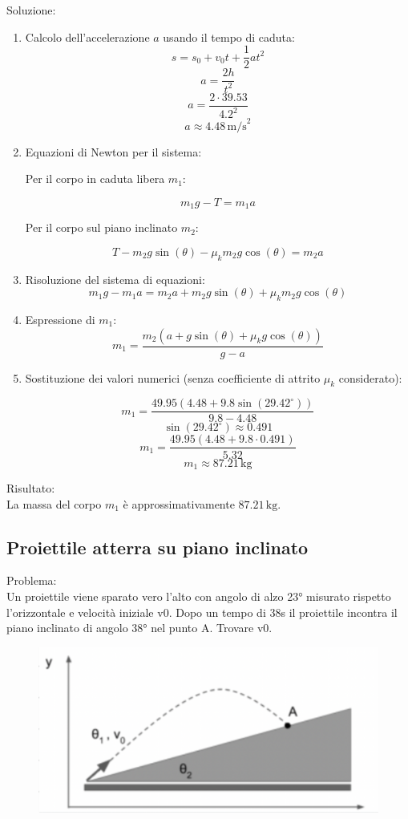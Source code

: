 \documentclass{article}
\begin{document}
Soluzione:
\begin{enumerate}
    \item Calcolo dell'accelerazione \( a \) usando il tempo di caduta:
    \[ s = s_0 + v_0t + \frac{1}{2}at^2 \]
    \[ a = \frac{2h}{t^2} \]
    \[ a = \frac{2 \cdot 39.53}{4.2^2} \]
    \[ a \approx 4.48 \, \text{m/s}^2 \]
    \item Equazioni di Newton per il sistema:
    
    Per il corpo in caduta libera \( m_1 \):
    
    \[ m_1 g - T = m_1 a \]
    
    Per il corpo sul piano inclinato \( m_2 \):
    
    \[ T - m_2 g \sin(\theta) - \mu_k m_2 g \cos(\theta) = m_2 a \]
    \item Risoluzione del sistema di equazioni:
    \[ m_1 g - m_1 a = m_2 a + m_2 g \sin(\theta) + \mu_k m_2 g \cos(\theta) \]
    \item Espressione di \( m_1 \):
    \[ m_1 = \frac{m_2 (a + g \sin(\theta) + \mu_k g \cos(\theta))}{g - a} \]
    \item Sostituzione dei valori numerici (senza coefficiente di attrito \( \mu_k \) considerato):
    
    \[ m_1 = \frac{49.95 (4.48 + 9.8 \sin(29.42^\circ))}{9.8 - 4.48} \]
    \[ \sin(29.42^\circ) \approx 0.491 \]
    \[ m_1 = \frac{49.95 (4.48 + 9.8 \cdot 0.491)}{5.32} \]
    \[ m_1 \approx 87.21 \, \text{kg} \]
\end{enumerate}

\noindent Risultato:\\
La massa del corpo \( m_1 \) è approssimativamente \( 87.21 \, \text{kg} \).
\subsection{Proiettile atterra su piano inclinato}
Problema:\\
Un proiettile viene sparato vero l'alto con angolo di alzo 23° misurato rispetto l'orizzontale e velocità iniziale v0. Dopo un tempo di 38s il proiettile incontra il piano inclinato di angolo 38° nel punto A. Trovare v0.
\begin{figure}[ht]
    \centering
    \includegraphics[width=0.5\linewidth]{Immagini/proiettinenelpiano.png}
\end{figure}
\end{document}
